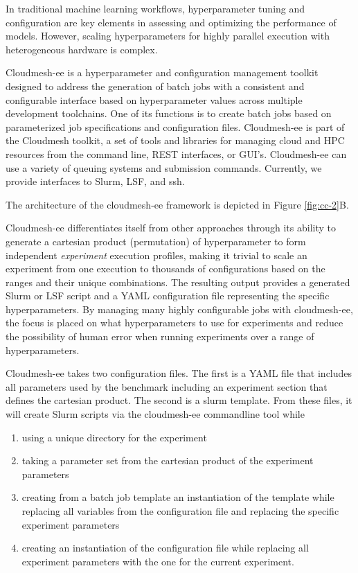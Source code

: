 In traditional machine learning workflows, hyperparameter tuning and configuration are key elements in assessing and optimizing the performance of models. However, scaling hyperparameters for highly parallel execution with heterogeneous hardware is complex.

Cloudmesh-ee \cite{cloudmesh-ee,las-2023-escience} is a hyperparameter and configuration management toolkit designed to address the generation of batch jobs with a consistent and configurable interface based on hyperparameter values across multiple development toolchains. One of its functions is to create batch jobs based on parameterized job specifications and configuration files.  Cloudmesh-ee is part of the Cloudmesh toolkit, a set of tools and libraries for managing cloud and HPC resources from the command line, REST interfaces, or GUI's.  Cloudmesh-ee can use a variety of queuing systems and submission commands. Currently, we provide interfaces to Slurm, LSF, and ssh. 

The architecture of the cloudmesh-ee framework is depicted in Figure \ref{fig:cc-2}B.

Cloudmesh-ee differentiates itself from other approaches through its ability to generate a cartesian product (permutation) of hyperparameter to form independent {\it experiment} execution profiles, making it trivial to scale an experiment from one execution to thousands of configurations based on the ranges and their unique combinations.  The resulting output provides a generated Slurm or LSF script and a YAML configuration file representing the specific hyperparameters.  By managing many highly configurable jobs with cloudmesh-ee, the focus is placed on what hyperparameters to use for experiments and reduce the possibility of human error when running experiments over a range of hyperparameters.

Cloudmesh-ee takes two configuration files. The first is a YAML file that includes all parameters used by the benchmark including an experiment section that defines the cartesian product. The second is a slurm template. From these files, it will create Slurm scripts via the cloudmesh-ee commandline tool while

\begin{enumerate}
  \item using a unique directory for the experiment
  \item taking a parameter set from the cartesian product of the experiment parameters
  \item creating from a batch job template an instantiation of the template while replacing all variables from the configuration file    and replacing the specific experiment parameters
  \item creating an instantiation of the configuration file while replacing all experiment parameters with the one for the current experiment.
\end{enumerate}

